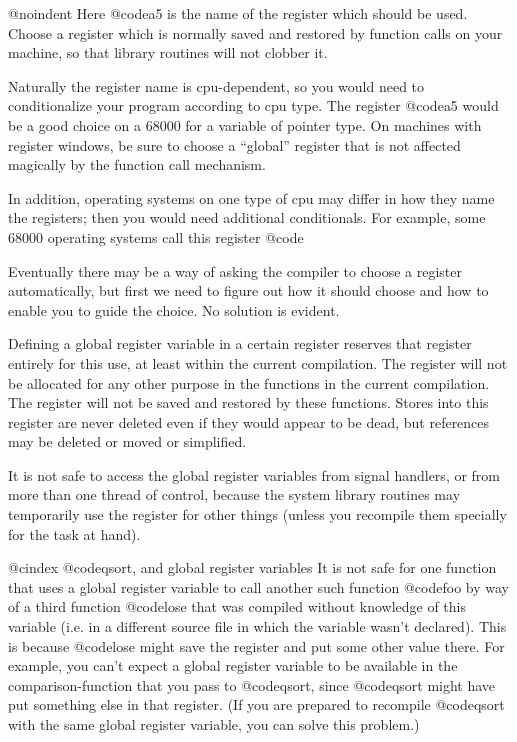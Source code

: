 {{{@noindent
Here @code{a5} is the name of the register which should be used.  Choose a
register which is normally saved and restored by function calls on your
machine, so that library routines will not clobber it.

Naturally the register name is cpu-dependent, so you would need to
conditionalize your program according to cpu type.  The register
@code{a5} would be a good choice on a 68000 for a variable of pointer
type.  On machines with register windows, be sure to choose a ``global''
register that is not affected magically by the function call mechanism.

In addition, operating systems on one type of cpu may differ in how they
name the registers; then you would need additional conditionals.  For
example, some 68000 operating systems call this register @code{%

Eventually there may be a way of asking the compiler to choose a register
automatically, but first we need to figure out how it should choose and
how to enable you to guide the choice.  No solution is evident.

Defining a global register variable in a certain register reserves that
register entirely for this use, at least within the current compilation.
The register will not be allocated for any other purpose in the functions
in the current compilation.  The register will not be saved and restored by
these functions.  Stores into this register are never deleted even if they
would appear to be dead, but references may be deleted or moved or
simplified.

It is not safe to access the global register variables from signal
handlers, or from more than one thread of control, because the system
library routines may temporarily use the register for other things (unless
you recompile them specially for the task at hand).

@cindex @code{qsort}, and global register variables
It is not safe for one function that uses a global register variable to
call another such function @code{foo} by way of a third function
@code{lose} that was compiled without knowledge of this variable (i.e. in a
different source file in which the variable wasn't declared).  This is
because @code{lose} might save the register and put some other value there.
For example, you can't expect a global register variable to be available in
the comparison-function that you pass to @code{qsort}, since @code{qsort}
might have put something else in that register.  (If you are prepared to
recompile @code{qsort} with the same global register variable, you can
solve this problem.)

}}}}
